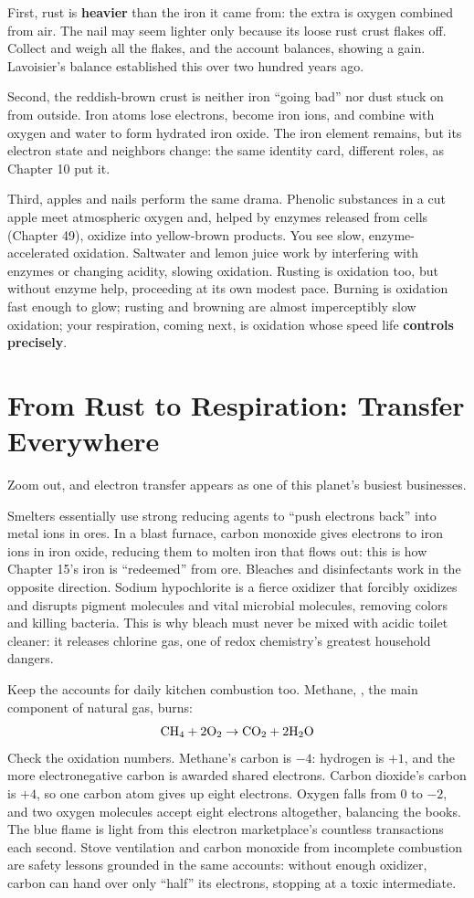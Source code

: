 First, rust is \textbf{heavier} than the iron it came from: the extra is oxygen combined from air. The nail may seem lighter only because its loose rust crust flakes off. Collect and weigh all the flakes, and the account balances, showing a gain. Lavoisier's balance established this over two hundred years ago.

Second, the reddish-brown crust is neither iron ``going bad'' nor dust stuck on from outside. Iron atoms lose electrons, become iron ions, and combine with oxygen and water to form hydrated iron oxide. The iron element remains, but its electron state and neighbors change: the same identity card, different roles, as Chapter 10 put it.

Third, apples and nails perform the same drama. Phenolic substances in a cut apple meet atmospheric oxygen and, helped by enzymes released from cells (Chapter 49), oxidize into yellow-brown products. You see slow, enzyme-accelerated oxidation. Saltwater and lemon juice work by interfering with enzymes or changing acidity, slowing oxidation. Rusting is oxidation too, but without enzyme help, proceeding at its own modest pace. Burning is oxidation fast enough to glow; rusting and browning are almost imperceptibly slow oxidation; your respiration, coming next, is oxidation whose speed life \textbf{controls precisely}.

\section{From Rust to Respiration: Transfer Everywhere}

Zoom out, and electron transfer appears as one of this planet's busiest businesses.

Smelters essentially use strong reducing agents to ``push electrons back'' into metal ions in ores. In a blast furnace, carbon monoxide gives electrons to iron ions in iron oxide, reducing them to molten iron that flows out: this is how Chapter 15's iron is ``redeemed'' from ore. Bleaches and disinfectants work in the opposite direction. Sodium hypochlorite is a fierce oxidizer that forcibly oxidizes and disrupts pigment molecules and vital microbial molecules, removing colors and killing bacteria. This is why bleach must never be mixed with acidic toilet cleaner: it releases chlorine gas, one of redox chemistry's greatest household dangers.

Keep the accounts for daily kitchen combustion too. Methane, , the main component of natural gas, burns:
\[\mathrm{CH_4} + \mathrm{2O_2} \rightarrow \mathrm{CO_2} + \mathrm{2H_2O}\]
Check the oxidation numbers. Methane's carbon is $-4$: hydrogen is $+1$, and the more electronegative carbon is awarded shared electrons. Carbon dioxide's carbon is $+4$, so one carbon atom gives up eight electrons. Oxygen falls from 0 to $-2$, and two oxygen molecules accept eight electrons altogether, balancing the books. The blue flame is light from this electron marketplace's countless transactions each second. Stove ventilation and carbon monoxide from incomplete combustion are safety lessons grounded in the same accounts: without enough oxidizer, carbon can hand over only ``half'' its electrons, stopping at a toxic intermediate.

